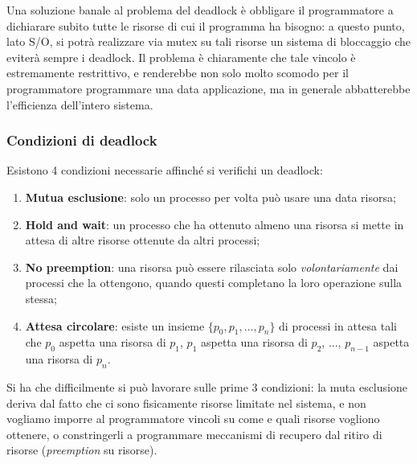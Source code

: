 \documentclass[a4paper,11pt]{article}
\begin{document}
Una soluzione banale al problema del deadlock è obbligare il programmatore a dichiarare subito tutte le risorse di cui il programma ha bisogno: a questo punto, lato S/O, si potrà realizzare via mutex su tali risorse un sistema di bloccaggio che eviterà sempre i deadlock.
Il problema è chiaramente che tale vincolo è estremamente restrittivo, e renderebbe non solo molto scomodo per il programmatore programmare una data applicazione, ma in generale abbatterebbe l'efficienza dell'intero sistema.

\subsubsection{Condizioni di deadlock}
Esistono 4 condizioni necessarie affinché si verifichi un deadlock:
\begin{enumerate}
	\item \textbf{Mutua esclusione}: solo un processo per volta può usare una data risorsa;
	\item \textbf{Hold and wait}: un processo che ha ottenuto almeno una risorsa si mette in attesa di altre risorse ottenute da altri processi;
	\item \textbf{No preemption}: una risorsa può essere rilasciata solo \textit{volontariamente} dai processi che la ottengono, quando questi completano la loro operazione sulla stessa;
	\item \textbf{Attesa circolare}: esiste un insieme $\{p_0, p_1, ..., p_n \}$ di processi in attesa tali che $p_0$ aspetta una risorsa di $p_1$, $p_1$ aspetta una risorsa di $p_2$, ..., $p_{n - 1}$ aspetta una risorsa di $p_n$.
\end{enumerate}

Si ha che difficilmente si può lavorare sulle prime 3 condizioni: la muta esclusione deriva dal fatto che ci sono fisicamente risorse limitate nel sistema, e non vogliamo imporre al programmatore vincoli su come e quali risorse vogliono ottenere, o constringerli a programmare meccanismi di recupero dal ritiro di risorse (\textit{preemption} su risorse).
\end{document}

